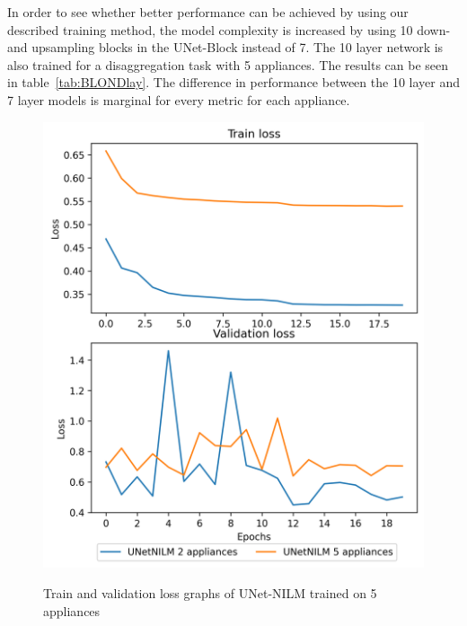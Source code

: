 \documentclass[sigconf]{acmart}
\begin{document}
In order to see whether better performance can be achieved by using our described training method, the model 
complexity is increased by using 10 down-and upsampling blocks in the UNet-Block instead of 7. The 10 layer network is also trained for a 
disaggregation task with 5 appliances. The results can be seen in table~\ref{tab:BLONDlay}. The difference in performance between 
the 10 layer and 7 layer models is marginal for every metric for each appliance.

\begin{figure}
  \caption{Train and validation loss graphs of UNet-NILM trained on 5 appliances}
  \includegraphics[scale=0.6]{figures/BLOND_loss_graphs.png}
  \label{fig:BLONDloss}
\end{figure}
\end{document}
